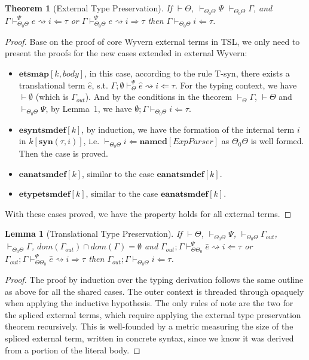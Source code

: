 \documentclass[letterpaper, notitlepage]{article}
\newtheorem{theorem}{Theorem}
\newtheorem{lemma}{Lemma}
\begin{document}
\begin{theorem}[External Type Preservation]
If $\vdash\Theta$, $\vdash_{\Theta_0\Theta}\Psi$ $\vdash_{\Theta_0\Theta}\Gamma$, and $\Gamma\vdash_{\Theta_0\Theta}^{\Psi} e\rightsquigarrow i\Leftarrow\tau$ or $\Gamma\vdash_{\Theta_0\Theta}^{\Psi} e\rightsquigarrow i\Rightarrow\tau$ then $\Gamma\vdash_{\Theta_0\Theta} i\Leftarrow\tau$.
\end{theorem}
\begin{proof}
Base on the proof of core Wyvern external terms in TSL, we only need to present the proofs for the new cases extended in external Wyvern:
\begin{itemize}
\item $\mathbf{etsmap}[k,body]$, in this case, according to the rule T-syn, there exists a translational term $\hat{e}$, s.t. $\Gamma;\emptyset\vdash_{\Theta}^{\Psi}\hat{e}\rightsquigarrow i\Leftarrow \tau$. For the typing context, we have $\vdash\emptyset$ (which is $\Gamma_{out}$). And by the conditions in the theorem $\vdash_{\Theta}\Gamma$, $\vdash\Theta$ and $\vdash_{\Theta_0\Theta}\Psi$, by Lemma~1, we have $\emptyset;\Gamma\vdash_{\Theta_0\Theta}i\Leftarrow\tau$. 
\item $\mathbf{esyntsmdef}[k]$, by induction, we have the formation of the internal term $i$ in $k[\mathbf{syn}(\tau,i)]$, i.e. $\vdash_{\Theta_0\Theta}i\Leftarrow \mathbf{named}[ExpParser]$ as $\Theta_0\Theta$ is well formed. Then the case is proved.
\item $\mathbf{eanatsmdef}[k]$, similar to the case $\mathbf{eanatsmdef}[k]$.
\item $\mathbf{etypetsmdef}[k]$, similar to the case $\mathbf{eanatsmdef}[k]$.
\end{itemize}
With these cases proved, we have the property holds for all external terms.
\end{proof}


\begin{lemma}[Translational Type Preservation]
If $\vdash\Theta$, $\vdash_{\Theta_0\Theta} \Psi$, $\vdash_{\Theta_0\Theta}\Gamma_{out}$, $\vdash_{\Theta_0\Theta}\Gamma$, $dom(\Gamma_{out})\cap dom(\Gamma)=\emptyset$ and $\Gamma_{out};\Gamma\vdash_{\Theta\Theta_0}^{\Psi}\hat{e}\rightsquigarrow i\Leftarrow\tau$ or $\Gamma_{out};\Gamma\vdash_{\Theta\Theta_0}^{\Psi}\hat{e}\rightsquigarrow i\Rightarrow \tau$ then $\Gamma_{out};\Gamma\vdash_{\Theta_0\Theta}i\Leftarrow \tau$.
\end{lemma}
\begin{proof}
The proof by induction over the typing derivation follows the same outline as
above for all the shared cases. The outer context is threaded through opaquely when
applying the inductive hypothesis. The only rules of note are the two for the spliced external
terms, which require applying the external type preservation theorem recursively.
This is well-founded by a metric measuring the size of the spliced external term, written
in concrete syntax, since we know it was derived from a portion of the literal body.
\end{proof}
\end{document}
